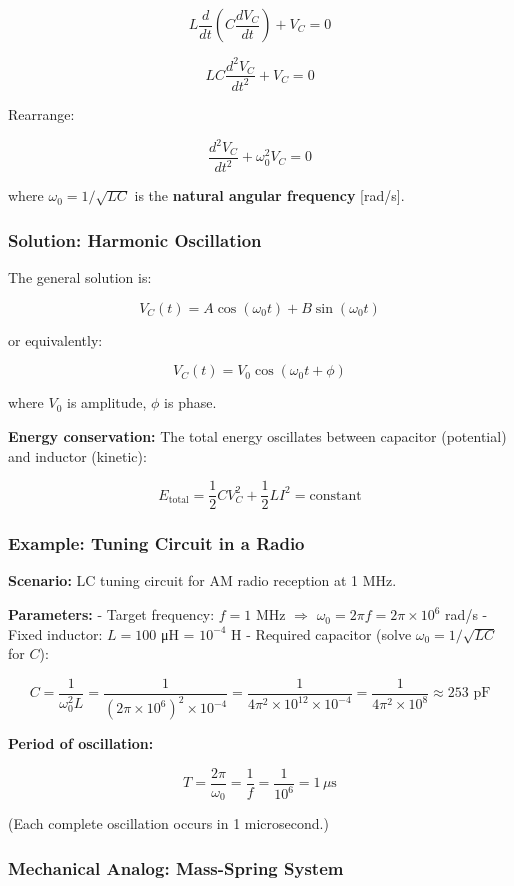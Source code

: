 \documentclass[
]{article}
\begin{document}
\[L\frac{d}{dt}\left(C\frac{dV_C}{dt}\right) + V_C = 0\]

\[LC\frac{d^2V_C}{dt^2} + V_C = 0\]

Rearrange:

\[\boxed{\frac{d^2V_C}{dt^2} + \omega_0^2 V_C = 0}\]

where \(\omega_0 = 1/\sqrt{LC}\) is the \textbf{natural angular
frequency} {[}rad/s{]}.

\subsubsection{Solution: Harmonic
Oscillation}\label{solution-harmonic-oscillation}

The general solution is:

\[\boxed{V_C(t) = A\cos(\omega_0 t) + B\sin(\omega_0 t)}\]

or equivalently:

\[V_C(t) = V_0 \cos(\omega_0 t + \phi)\]

where \(V_0\) is amplitude, \(\phi\) is phase.

\textbf{Energy conservation:} The total energy oscillates between
capacitor (potential) and inductor (kinetic):

\[E_{\text{total}} = \frac{1}{2}CV_C^2 + \frac{1}{2}LI^2 = \text{constant}\]

\subsubsection{Example: Tuning Circuit in a
Radio}\label{example-tuning-circuit-in-a-radio}

\textbf{Scenario:} LC tuning circuit for AM radio reception at 1 MHz.

\textbf{Parameters:} - Target frequency: \(f = 1\) MHz \(\Rightarrow\)
\(\omega_0 = 2\pi f = 2\pi \times 10^6\) rad/s - Fixed inductor:
\(L = 100\) μH = \(10^{-4}\) H - Required capacitor (solve
\(\omega_0 = 1/\sqrt{LC}\) for \(C\)):

\[C = \frac{1}{\omega_0^2 L} = \frac{1}{(2\pi \times 10^6)^2 \times 10^{-4}} = \frac{1}{4\pi^2 \times 10^{12} \times 10^{-4}} = \frac{1}{4\pi^2 \times 10^8} \approx 253 \text{ pF}\]

\textbf{Period of oscillation:}

\[T = \frac{2\pi}{\omega_0} = \frac{1}{f} = \frac{1}{10^6} = 1 \, \mu\text{s}\]

(Each complete oscillation occurs in 1 microsecond.)

\subsubsection{Mechanical Analog: Mass-Spring
System}\label{mechanical-analog-mass-spring-system}
\end{document}
